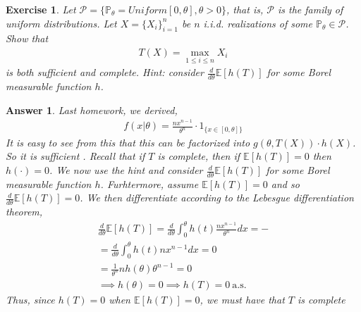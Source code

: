 \documentclass[12pt]{article}
\theoremstyle{colon}
\newtheorem{exercise}{Exercise}
\newtheorem*{answer}{Answer}
\begin{document}
\clearpage

\begin{exercise}
  Let $\mathcal{P} = \{ \mathbb{P}_\theta = Uniform[0,\theta], \theta > 0 \}$, that is, $\mathcal{P}$ is the family of uniform distributions. Let $X = \{ X_i \}_{i=1}^n$ be $n$ i.i.d. realizations of some $\mathbb{P}_\theta \in \mathcal{P}$. Show that
  \begin{gather*}
    T(X) = \max_{1 \leq i \leq n} X_i
  \end{gather*}
  is both sufficient and complete. Hint: consider $\frac{d}{d\theta} \mathbb{E}[h(T)]$ for some Borel measurable function $h$.
\end{exercise}

\begin{answer}
  Last homework, we derived,
  \begin{gather*}
    f(x | \theta) = \frac{n x^{n-1}}{\theta^n} \cdot 1_{\{ x \in [0,\theta] \}}
  \end{gather*}
  It is easy to see from this that this can be factorized into $g(\theta, T(X)) \cdot h(X)$. So it is sufficient . Recall that if $T$ is complete, then if $\mathbb{E}[h(T)] = 0$ then $h(\cdot) = 0$.
  We now use the hint and consider $\frac{d}{d\theta} \mathbb{E}[h(T)]$ for some Borel measurable function $h$. Furhtermore, assume $\mathbb{E}[h(T)] = 0$ and so $\frac{d}{d\theta} \mathbb{E}[h(T)] = 0$. We then differentiate according to the Lebesgue differentiation theorem,
  \begin{gather*}
    \frac{d}{d\theta} \mathbb{E}[h(T)] = \frac{d}{d\theta} \int_0^\theta h(t) \frac{n x^{n-1}}{\theta^n} dx = - \\
    = \frac{d}{d\theta} \int_0^\theta h(t) n x^{n-1} dx = 0 \\
    = \frac{1}{\theta^n} n h(\theta) \theta^{n-1} = 0 \\
    \implies h(\theta) = 0 \implies h(T) = 0 \ \text{a.s.}
  \end{gather*}
  Thus, since $h(T) = 0$ when $\mathbb{E}[h(T)] = 0$, we must have that $T$ is complete
\end{answer}

\clearpage
\end{document}
